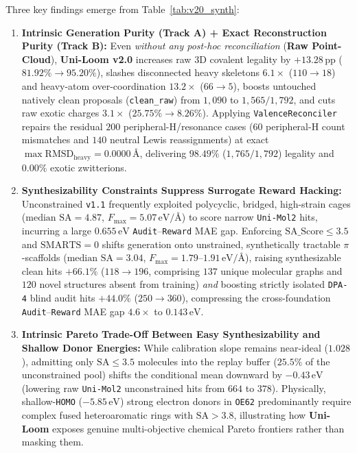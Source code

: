 \documentclass[11pt,a4paper]{article}
\begin{document}
Three key findings emerge from Table~\ref{tab:v20_synth}:
\begin{enumerate}[leftmargin=1.6em,itemsep=2pt,topsep=2pt]
    \item \textbf{Intrinsic Generation Purity (Track A) + Exact Reconstruction Purity (Track B):} Even \emph{without any post-hoc reconciliation} (\textbf{Raw Point-Cloud}), \textbf{Uni-Loom v2.0} increases raw 3D covalent legality by $+13.28\,\text{pp}$ ($81.92\% \to 95.20\%$), slashes disconnected heavy skeletons $6.1\times$ ($110 \to 18$) and heavy-atom over-coordination $13.2\times$ ($66 \to 5$), boosts untouched natively clean proposals (\texttt{clean\_raw}) from $1{,}090$ to $1{,}565 / 1{,}792$, and cuts raw exotic charges $3.1\times$ ($25.75\% \to 8.26\%$). Applying \texttt{ValenceReconciler} repairs the residual $200$ peripheral-H/resonance cases ($60$ peripheral-H count mismatches and $140$ neutral Lewis reassignments) at exact $\max \text{RMSD}_{\text{heavy}} = 0.0000\,\text{\AA}$, delivering $98.49\%$ ($1{,}765/1{,}792$) legality and $0.00\%$ exotic zwitterions.
    \item \textbf{Synthesizability Constraints Suppress Surrogate Reward Hacking:} Unconstrained \texttt{v1.1} frequently exploited polycyclic, bridged, high-strain cages ($\text{median SA} = 4.87$, $F_{\max} = 5.07\,\text{eV/\AA}$) to score narrow \texttt{Uni-Mol2} hits, incurring a large $0.655\,\text{eV}$ \texttt{Audit}--\texttt{Reward} MAE gap. Enforcing $\text{SA\_Score} \le 3.5$ and $\text{SMARTS} = 0$ shifts generation onto unstrained, synthetically tractable $\pi$-scaffolds ($\text{median SA} = 3.04$, $F_{\max} = 1.79\text{--}1.91\,\text{eV/\AA}$), raising synthesizable clean hits $+66.1\%$ ($118 \to 196$, comprising $137$ unique molecular graphs and $120$ novel structures absent from training) \emph{and} boosting strictly isolated \texttt{DPA-4} blind audit hits $+44.0\%$ ($250 \to 360$), compressing the cross-foundation \texttt{Audit}--\texttt{Reward} MAE gap $4.6\times$ to $0.143\,\text{eV}$.
    \item \textbf{Intrinsic Pareto Trade-Off Between Easy Synthesizability and Shallow Donor Energies:} While calibration slope remains near-ideal ($1.028$), admitting only $\text{SA} \le 3.5$ molecules into the replay buffer ($25.5\%$ of the unconstrained pool) shifts the conditional mean downward by $-0.43\,\text{eV}$ (lowering raw \texttt{Uni-Mol2} unconstrained hits from $664$ to $378$). Physically, shallow-\texttt{HOMO} ($-5.85\,\text{eV}$) strong electron donors in \texttt{OE62} predominantly require complex fused heteroaromatic rings with $\text{SA} > 3.8$, illustrating how \textbf{Uni-Loom} exposes genuine multi-objective chemical Pareto frontiers rather than masking them.
\end{enumerate}
\end{document}

